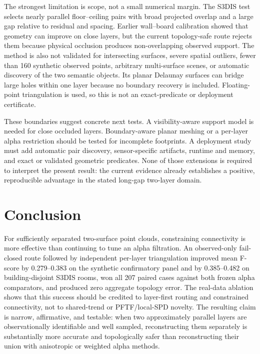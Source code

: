 \documentclass[12pt,a4paper]{article}
\begin{document}
The strongest limitation is scope, not a small numerical margin. The S3DIS test
selects nearly parallel floor--ceiling pairs with broad projected overlap and a
large gap relative to residual and spacing. Earlier wall--board calibration showed
that geometry can improve on close layers, but the current topology-safe route
rejects them because physical occlusion produces non-overlapping observed support.
The method is also not validated for intersecting surfaces, severe spatial
outliers, fewer than 160 synthetic observed points, arbitrary multi-surface scenes,
or automatic discovery of the two semantic objects. Its planar Delaunay surfaces
can bridge large holes within one layer because no boundary recovery is included.
Floating-point triangulation is used, so this is not an exact-predicate or
deployment certificate.

These boundaries suggest concrete next tests. A visibility-aware support model is
needed for close occluded layers. Boundary-aware planar meshing or a per-layer
alpha restriction should be tested for incomplete footprints. A deployment study
must add automatic pair discovery, sensor-specific artifacts, runtime and memory,
and exact or validated geometric predicates. None of those extensions is required
to interpret the present result: the current evidence already establishes a
positive, reproducible advantage in the stated long-gap two-layer domain.

\section{Conclusion}

For sufficiently separated two-surface point clouds, constraining connectivity is
more effective than continuing to tune an alpha filtration. An observed-only
fail-closed route followed by independent per-layer triangulation improved mean
F-score by 0.279--0.383 on the synthetic confirmatory panel and by 0.385--0.482 on
building-disjoint S3DIS rooms, won all 207 paired cases against both frozen alpha
comparators, and produced zero aggregate topology error. The real-data ablation
shows that this success should be credited to layer-first routing and constrained
connectivity, not to shared-trend or PFTF/local-SPD novelty. The resulting claim is
narrow, affirmative, and testable: when two approximately parallel layers are
observationally identifiable and well sampled, reconstructing them separately is
substantially more accurate and topologically safer than reconstructing their
union with anisotropic or weighted alpha methods.
\end{document}
